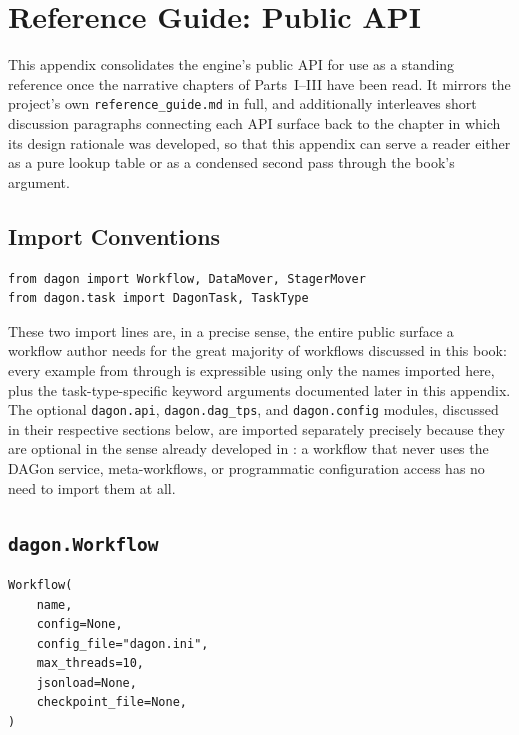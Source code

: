 \chapter{Reference Guide: Public API}
\label{app:reference}

This appendix consolidates the engine's public API for use as a standing
reference once the narrative chapters of Parts~I--III have been read. It
mirrors the project's own \texttt{reference\_guide.md} in full, and
additionally interleaves short discussion paragraphs connecting each API
surface back to the chapter in which its design rationale was developed, so
that this appendix can serve a reader either as a pure lookup table or as a
condensed second pass through the book's argument.

\section{Import Conventions}

\begin{lstlisting}
from dagon import Workflow, DataMover, StagerMover
from dagon.task import DagonTask, TaskType
\end{lstlisting}

These two import lines are, in a precise sense, the entire public surface a
workflow author needs for the great majority of workflows discussed in this
book: every example from  through
 is expressible using only the names imported here,
plus the task-type-specific keyword arguments documented later in this
appendix. The optional \texttt{dagon.api}, \texttt{dagon.dag\_tps}, and
\texttt{dagon.config} modules, discussed in their respective sections below,
are imported separately precisely because they are optional in the sense
already developed in : a workflow that never uses
the DAGon service, meta-workflows, or programmatic configuration access has
no need to import them at all.

\section{\texttt{dagon.Workflow}}

\begin{lstlisting}[caption={Constructor signature.}]
Workflow(
    name,
    config=None,
    config_file="dagon.ini",
    max_threads=10,
    jsonload=None,
    checkpoint_file=None,
)
\end{lstlisting}

